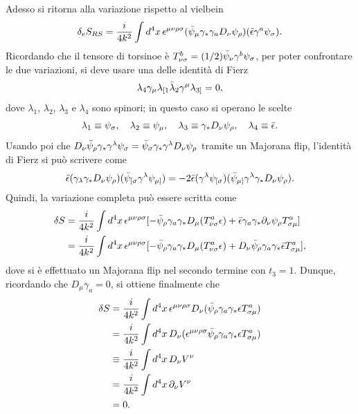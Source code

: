 Adesso si ritorna alla variazione rispetto al vielbein
\begin{equation}
    \delta_e S_{RS} = \frac{i}{4k^2}\int d^4x\,\epsilon^{\mu\nu\rho\sigma}(\bar{\psi}_\mu\gamma_*\gamma_aD_\nu\psi_\rho)(\bar{\epsilon}\gamma^a\psi_\sigma).
\end{equation}
Ricordando che il tensore di torsinoe è $T^b_{\nu\sigma} = (1/2)\bar{\psi}_\nu\gamma^b\psi_\sigma$, per poter confrontare le due variazioni, si deve usare una delle identità di Fierz
\begin{equation}
    \lambda_4\gamma_\mu \lambda_{[1}\bar{\lambda}_2\gamma^\mu\lambda_{3]} = 0,
\end{equation}
dove $\lambda_1$, $\lambda_2$, $\lambda_3$ e $\lambda_4$ sono spinori; in questo caso si operano le scelte
\begin{equation}
    \lambda_1 \equiv \psi_\sigma,\quad \lambda_2 \equiv \psi_\mu,\quad \lambda_3 \equiv \gamma_*D_\nu\psi_\rho,\quad \lambda_4 \equiv \bar{\epsilon}.
\end{equation}
Usando poi che $D_\nu\bar{\psi}_\rho\gamma_*\gamma^\lambda\psi_\sigma = \bar{\psi}_\sigma\gamma_*\gamma^\lambda D_\nu\psi_\rho$ tramite un Majorana flip, l'identità di Fierz si può scrivere come
\begin{equation}
    \bar{\epsilon}(\gamma_\lambda\gamma_* D_\nu\psi_\rho)(\bar{\psi}_{[\sigma}\gamma^\lambda\psi_{\mu]}) = -2\bar{\epsilon}(\gamma^\lambda\psi_{[\sigma})(\bar{\psi}_{\mu]}\gamma^\lambda\gamma_* D_\nu\psi_\rho).
\end{equation}
Quindi, la variazione completa può essere scritta come
\begin{equation}
    \begin{split}
        \delta S &= \frac{i}{4k^2}\int d^4x\,\epsilon^{\mu\nu\rho\sigma}[-\bar{\psi}_\rho\gamma_a\gamma_*D_\mu(T^a_{\nu\sigma}\epsilon) + \bar{\epsilon}\gamma_a\gamma_*\partial_\nu\psi_\rho T^a_{\sigma\mu}] \\
        &= \frac{i}{4k^2}\int d^4x\,\epsilon^{\mu\nu\rho\sigma}[-\bar{\psi}_\rho\gamma_a\gamma_*D_\mu(T^a_{\nu\sigma}\epsilon) + D_\nu\bar{\psi}_\rho\gamma_a\gamma_*\bar{\epsilon}T^a_{\sigma\mu}],
    \end{split}
\end{equation}
dove si è effettuato un Majorana flip nel secondo termine con $t_3 = 1$. Dunque, ricordando che $D_\mu\gamma_a = 0$, si ottiene finalmente che 
\begin{equation}
    \begin{split}
        \delta S &= \frac{i}{4k^2}\int d^4x\,\epsilon^{\mu\nu\rho\sigma}D_\nu(\bar{\psi}_\rho\gamma_a\gamma_*\epsilon T^a_{\sigma\mu}) \\
        &= \frac{i}{4k^2}\int d^4x\,D_\nu(\epsilon^{\mu\nu\rho\sigma}\bar{\psi}_\rho\gamma_a\gamma_*\epsilon T^a_{\sigma\mu}) \\
        &\equiv \frac{i}{4k^2}\int d^4x\,D_\nu V^\nu \\
        &= \frac{i}{4k^2}\int d^4x\,\partial_\nu V^\nu \\
        &= 0.
    \end{split}
\end{equation}

